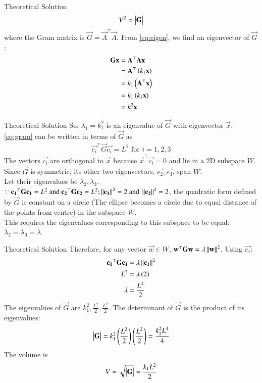 \documentclass{beamer}
\begin{document}
\begin{frame}{Theoretical Solution}
\begin{align}
    V^2 = \begin{vmatrix}\mathbf{G}\end{vmatrix} 
\end{align}
where the Gram matrix is $\vec{G} = \vec{A}^\top\vec{A}$. From \eqref{eq:eigen}, we find an eigenvector of $\vec{G}$:
\begin{align}
    \mathbf{G}\mathbf{x} &= \mathbf{A}^\top\mathbf{A}\mathbf{x} \\
    &= \mathbf{A}^\top\left(k_1\mathbf{x}\right) \\
    &= k_1\left(\mathbf{A}^\top\mathbf{x}\right) \\
    &= k_1\left(k_1\mathbf{x}\right) \\
    &= k_1^2\mathbf{x}
\end{align}
\end{frame}

\begin{frame}{Theoretical Solution}
So, $\lambda_1 = k_1^2$ is an eigenvalue of $\vec{G}$ with eigenvector $\vec{x}$. \\
\eqref{eq:gram} can be written in terms of $\vec{G}$ as
\begin{align}
    \vec{c_i}^\top \vec{G} \vec{c_i} = L^2 \text{ for } i=1,2,3
\end{align}
The vectors $\vec{c_i}$ are orthogonal to $\vec{x}$ because $\vec{x}^\top\vec{c_i}=0$ and lie in a 2D subspace $W$. \\
Since $\vec{G}$ is symmetric, its other two eigenvectors, $\vec{e_2}, \vec{e_3}$, span $W$. \\
Let their eigenvalues be $\lambda_2, \lambda_3$. \\
$\because \mathbf{c_1}^\top\mathbf{G}\mathbf{c_1} = L^2\text{ and }\mathbf{c_2}^\top\mathbf{G}\mathbf{c_2} = L^2; \left\lVert\mathbf{c_1}\right\rVert^2 = 2\text{ and }\left\lVert\mathbf{c_2}\right\rVert^2 = 2$, the quadratic form defined by $\vec{G}$ is constant on a circle (The ellipse becomes a circle due to equal distance of the points from centre) in the subspace $W$. \\
This requires the eigenvalues corresponding to this subspace to be equal: $\lambda_2 = \lambda_3 = \lambda$.
\end{frame}

\begin{frame}{Theoretical Solution}
    Therefore, for any vector $\vec{w} \in W$, $\mathbf{w}^\top\mathbf{G}\mathbf{w} = \lambda\left\lVert\mathbf{w}\right\rVert^2$.
Using $\vec{c_1}$:
\begin{align}
    \mathbf{c_1}^\top\mathbf{G}\mathbf{c_1} &= \lambda\left\lVert\mathbf{c_1}\right\rVert^2 \\
    L^2 &= \lambda\left(2\right) \\
    \lambda &= \frac{L^2}{2}
\end{align}
The eigenvalues of $\vec{G}$ are $k_1^2, \frac{L^2}{2}, \frac{L^2}{2}$. The determinant of $\vec{G}$ is the product of its eigenvalues:
\begin{align}
    \begin{vmatrix}\mathbf{G}\end{vmatrix} = k_1^2 \left(\frac{L^2}{2}\right) \left(\frac{L^2}{2}\right) = \frac{k_1^2 L^4}{4}
\end{align}
The volume is 
\begin{align}
    V = \sqrt{\begin{vmatrix}\mathbf{G}\end{vmatrix}} = \frac{k_1 L^2}{2}
\end{align}
\end{frame}
\end{document}

